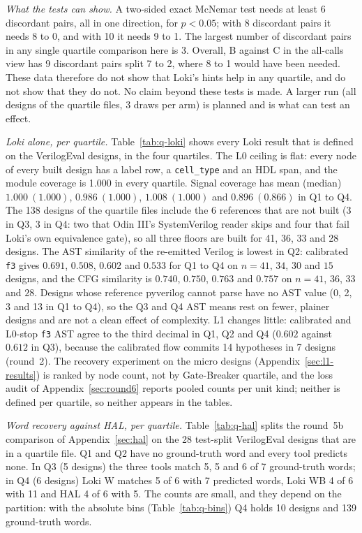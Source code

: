 \documentclass[conference]{IEEEtran}
\newcommand{\code}[1]{\texttt{#1}}
\begin{document}
\emph{What the tests can show.} A two-sided exact McNemar test needs at least 6 discordant
pairs, all in one direction, for $p<0.05$; with 8 discordant pairs it needs 8 to 0, and with 10
it needs 9 to 1. The largest number of discordant pairs in any single quartile comparison here
is 3. Overall, B against C in the all-calls view has 9 discordant pairs split 7 to 2, where
8 to 1 would have been needed. These data therefore do not show that Loki's hints help in any
quartile, and do not show that they do not. No claim beyond these tests is made. A larger run
(all designs of the quartile files, 3 draws per arm) is planned and is what can test an effect.



\emph{Loki alone, per quartile.} Table~\ref{tab:q-loki} shows every Loki result that is defined
on the VerilogEval designs, in the four quartiles. The L0 ceiling is flat: every node of every
built design has a label row, a \code{cell\_type} and an HDL span, and the module coverage is
1.000 in every quartile. Signal coverage has mean (median) $1.000\ (1.000)$, $0.986\ (1.000)$,
$1.008\ (1.000)$ and $0.896\ (0.866)$ in Q1 to Q4. The 138 designs of the quartile files include
the 6 references that are not built (3 in Q3, 3 in Q4: two that Odin III's SystemVerilog reader
skips and four that fail Loki's own equivalence gate), so all three floors are built for 41, 36,
33 and 28 designs. The AST similarity of the re-emitted Verilog is lowest in Q2: calibrated
\code{f3} gives $0.691$, $0.508$, $0.602$ and $0.533$ for Q1 to Q4 on $n=41$, $34$, $30$ and
$15$ designs, and the CFG similarity is $0.740$, $0.750$, $0.763$ and $0.757$ on $n=41$, $36$,
$33$ and $28$. Designs whose reference pyverilog cannot parse have no AST value (0, 2, 3 and 13
in Q1 to Q4), so the Q3 and Q4 AST means rest on fewer, plainer designs and are not a clean
effect of complexity. L1 changes little: calibrated and L0-stop \code{f3} AST agree to the third
decimal in Q1, Q2 and Q4 ($0.602$ against $0.612$ in Q3), because the calibrated flow commits
14 hypotheses in 7 designs (round~2). The recovery experiment on the micro designs
(Appendix~\ref{sec:l1-results}) is ranked by node count, not by Gate-Breaker quartile, and the
loss audit of Appendix~\ref{sec:round6} reports pooled counts per unit kind; neither is
defined per quartile, so neither appears in the tables.

\emph{Word recovery against HAL, per quartile.} Table~\ref{tab:q-hal} splits the round~5b
comparison of Appendix~\ref{sec:hal} on the 28 test-split VerilogEval designs that are in a
quartile file. Q1 and Q2 have no ground-truth word and every tool predicts none. In Q3
(5 designs) the three tools match 5, 5 and 6 of 7 ground-truth words; in Q4 (6 designs) Loki W
matches 5 of 6 with 7 predicted words, Loki WB 4 of 6 with 11 and HAL 4 of 6 with 5. The counts
are small, and they depend on the partition: with the absolute bins (Table~\ref{tab:q-bins}) Q4
holds 10 designs and 139 ground-truth words.
\end{document}
